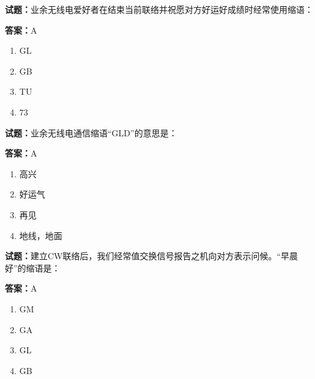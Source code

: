 \documentclass{ctexbook}
\begin{document}




\vspace{1em}

\textbf{试题：}业余无线电爱好者在结束当前联络并祝愿对方好运好成绩时经常使用缩语： 

\textbf{答案：}A 

\begin{enumerate}[leftmargin=3em]
  \item GL 

  \item GB 

  \item TU 

  \item 73 

\end{enumerate}





\vspace{1em}

\textbf{试题：}业余无线电通信缩语“GLD”的意思是： 

\textbf{答案：}A 

\begin{enumerate}[leftmargin=3em]
  \item 高兴 


  \item 好运气 

  \item 再见 

  \item 地线，地面 

\end{enumerate}





\vspace{1em}

\textbf{试题：}建立CW联络后，我们经常值交换信号报告之机向对方表示问候。“早晨好”的缩语是： 

\textbf{答案：}A 

\begin{enumerate}[leftmargin=3em]
  \item GM 

  \item GA 

  \item GL 

  \item GB 

\end{enumerate}
\end{document}
